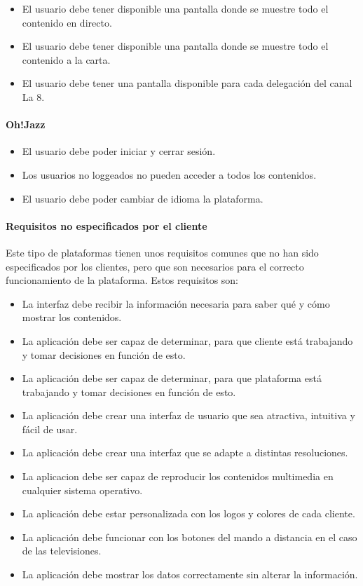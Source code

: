 \begin{itemize}
    \item El usuario debe tener disponible una pantalla donde se muestre todo el contenido en directo.
    \item El usuario debe tener disponible una pantalla donde se muestre todo el contenido a la carta.
    \item El usuario debe tener una pantalla disponible para cada delegación del canal La 8.
\end{itemize}

\paragraph{Oh!Jazz}
\label{par:analisis_requisitos_funcionales_ohjazz}

\begin{itemize}
    \item El usuario debe poder iniciar y cerrar sesión.
    \item Los usuarios no loggeados no pueden acceder a todos los contenidos.
    \item El usuario debe poder cambiar de idioma la plataforma.
\end{itemize}

\paragraph{Requisitos no especificados por el cliente}
\label{par:analisis_requisitos_funcionales_no_cliente}

Este tipo de plataformas tienen unos requisitos comunes que no han sido especificados por los clientes,
pero que son necesarios para el correcto funcionamiento de la plataforma. Estos requisitos son:

\begin{itemize}
    \item La interfaz debe recibir la información necesaria para saber qué y cómo mostrar los contenidos.
    \item La aplicación debe ser capaz de determinar, para que cliente está trabajando y tomar decisiones 
    en función de esto.
    \item La aplicación debe ser capaz de determinar, para que plataforma está trabajando y tomar decisiones
    en función de esto.
    \item La aplicación debe crear una interfaz de usuario que sea atractiva, intuitiva y fácil de usar.
    \item La aplicación debe crear una interfaz que se adapte a distintas resoluciones.
    \item La aplicacion debe ser capaz de reproducir los contenidos multimedia en cualquier sistema operativo.
    \item La aplicación debe estar personalizada con los logos y colores de cada cliente.
    \item La aplicación debe funcionar con los botones del mando a distancia en el caso de las televisiones.
    \item La aplicación debe mostrar los datos correctamente sin alterar la información.
\end{itemize}

